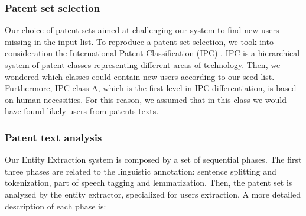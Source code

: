 \documentclass[]{book}
\begin{document}
\subsubsection*{Patent set selection}\label{patent-set-selection}

Our choice of patent sets aimed at challenging our system to find new
users missing in the input list. To reproduce a patent set selection, we
took into consideration the International Patent Classification (IPC)
\citep{wipo1}. IPC is a hierarchical system of patent classes
representing different areas of technology. Then, we wondered which
classes could contain new users according to our seed list. Furthermore,
IPC class A, which is the first level in IPC differentiation, is based
on human necessities. For this reason, we assumed that in this class we
would have found likely users from patents texts.

\subsubsection*{Patent text analysis}\label{patent-text-analysis}

Our Entity Extraction system is composed by a set of sequential phases.
The first three phases are related to the linguistic annotation:
sentence splitting and tokenization, part of speech tagging and
lemmatization. Then, the patent set is analyzed by the entity extractor,
specialized for users extraction. A more detailed description of each
phase is:
\end{document}
